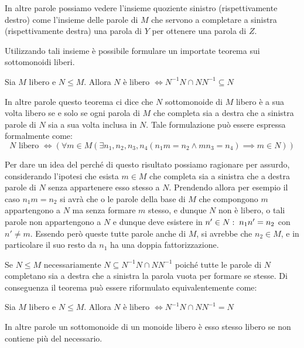 In altre parole possiamo vedere l'insieme quoziente sinistro (rispettivamente destro) come l'insieme delle parole di \(M\) che servono a completare a sinistra (rispettivamente destra) una parola di \(Y\) per ottenere una parola di \(Z\).

Utilizzando tali insieme è possibile formulare un importate teorema sui sottomonoidi liberi.

\begin{theorem}\label{thm:schützenberger_monoids}
  Sia \(M\) libero e \(N \leq M\). Allora \(N \text{ è libero } \iff N^{-1}N \cap NN^{-1} \subseteq N\)
\end{theorem}
In altre parole questo teorema ci dice che \(N\) sottomonoide di \(M\) libero è a sua volta libero se e solo se ogni parola di \(M\) che completa sia a destra che a sinistra parole di \(N\) sia a sua volta inclusa in \(N\).
Tale formulazione può essere espressa formalmente come:
\[N \text{ libero } \iff \left(\forall m \in M (\exists n_1,n_2,n_3,n_4( n_1m=n_2 \land mn_3=n_4) \implies m \in N)\right)\]

Per dare un idea del perché di questo risultato possiamo ragionare per assurdo, considerando l'ipotesi che esista \(m \in M\) che completa sia a sinistra che a destra parole di \(N\) senza appartenere esso stesso a \(N\).
Prendendo allora per esempio il caso \(n_1m=n_2\) si avrà che o le parole della base di \(M\) che compongono \(m\) appartengono a \(N\) ma senza formare \(m\) stesso, e dunque \(N\) non è libero, o tali parole non appartengono a \(N\) e dunque deve esistere in \(n' \in N:\; n_1n'=n_2\) con \(n' \neq m\).
Essendo però queste tutte parole anche di \(M\), si avrebbe che \(n_2 \in M\), e in particolare il suo resto da \(n_1\) ha una doppia fattorizzazione.

\begin{note}[Osservazioni]
  Se \(N\leq M\) necessariamente \(N \subseteq N^{-1}N \cap NN^{-1}\) poiché tutte le parole di \(N\) completano sia a destra che a sinistra la parola vuota per formare se stesse.
  Di conseguenza il teorema può essere riformulato equivalentemente come:
  \begin{theorem}
    Sia \(M\) libero e \(N \leq M\). Allora \(N \text{ è libero } \iff N^{-1}N \cap NN^{-1} = N\)
  \end{theorem}
  In altre parole un sottomonoide di un monoide libero è esso stesso libero se non contiene più del necessario.
\end{note}

